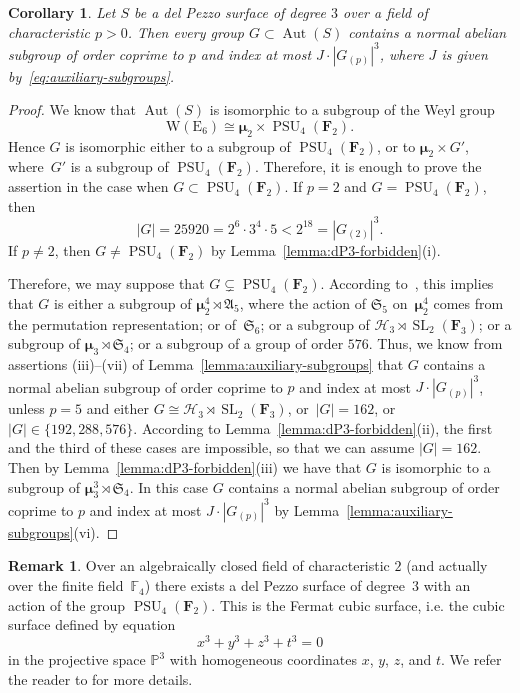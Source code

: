 \documentclass[12pt]{amsart}
\numberwithin{equation}{section}
\newtheorem{corollary}[subsection]{Corollary}
\theoremstyle{definition}
\newtheorem{remark}[subsection]{Remark}
\newcommand{\mumu}{\boldsymbol{\mu}}
\newcommand{\WE}{\mathrm{W}(\mathrm{E}_6)}
\newcommand{\PP}{\mathbb P}
\newcommand{\HHH}{\mathscr{H}}
\DeclareMathOperator{\Aut}{Aut}
\DeclareMathOperator{\SL}{SL}
\DeclareMathOperator{\PSU}{PSU}
\begin{document}
\begin{corollary}\label{corollary:dP3}
Let $S$ be a del Pezzo surface of degree $3$ over a field
of characteristic $p>0$.
Then every group $G\subset\Aut(S)$ contains a normal abelian subgroup of order
coprime to $p$
and index at most $J\cdot |G_{(p)}|^3$, where $J$ is given by~\eqref{eq:auxiliary-subgroups}.
\end{corollary}

\begin{proof}
We know that $\Aut(S)$ is isomorphic to a subgroup of the Weyl group
$$
\WE\cong\mumu_2\times\PSU_4(\mathbf{F}_2).
$$
Hence $G$ is isomorphic either to a subgroup of $\PSU_4(\mathbf{F}_2)$, or
to $\mumu_2\times G'$, where~$G'$ is a subgroup of $\PSU_4(\mathbf{F}_2)$.
Therefore, it is enough to prove the assertion in the case when
$G\subset\PSU_4(\mathbf{F}_2)$.
If $p=2$ and $G=\PSU_4(\mathbf{F}_2)$, then
$$
|G|=25920=2^6\cdot 3^4\cdot 5< 2^{18}=|G_{(2)}|^3.
$$
If $p\neq 2$, then $G\neq \PSU_4(\mathbf{F}_2)$ by Lemma~\ref{lemma:dP3-forbidden}(i).

Therefore, we may suppose that $G\subsetneq\PSU_4(\mathbf{F}_2)$.
According to~\mbox{\cite[p.~26]{Atlas}},
this implies that $G$ is either a subgroup of
$\mumu_2^4\rtimes\mathfrak{A}_5$, where
the action of $\mathfrak{S}_5$ on~$\mumu_2^4$ comes from the permutation representation;
or of~$\mathfrak{S}_6$; or a subgroup of
$\HHH_3\rtimes\SL_2(\mathbf{F}_3)$; or a subgroup of
$\mumu_3\rtimes\mathfrak{S}_4$; or a subgroup of
a group of order $576$.
Thus, we know from assertions (iii)--(vii)
of Lemma~\ref{lemma:auxiliary-subgroups} that $G$ contains a normal abelian subgroup of order
coprime to $p$
and index at most $J\cdot |G_{(p)}|^3$, unless $p=5$ and either
$G\cong \HHH_3\rtimes\SL_2(\mathbf{F}_3)$, or~\mbox{$|G|=162$}, or $|G|\in\{192, 288, 576\}$.
According to Lemma~\ref{lemma:dP3-forbidden}(ii), the first and the third
of these cases are impossible, so that we can assume $|G|=162$.
Then by Lemma~\ref{lemma:dP3-forbidden}(iii)
we have that $G$ is isomorphic to a subgroup of
$ \mumu_3^3\rtimes\mathfrak{S}_4.
$
In this case $G$ contains a normal abelian subgroup of order
coprime to $p$ and index at most $J\cdot |G_{(p)}|^3$
by Lemma~\ref{lemma:auxiliary-subgroups}(vi).
\end{proof}


\begin{remark}
Over an algebraically closed field of characteristic $2$ (and actually over the finite
field~$\mathbb{F}_4$) there exists a del Pezzo surface of degree~$3$
with an action of the group $\PSU_4(\mathbf{F}_2)$. This is the Fermat cubic surface, i.e.
the cubic surface defined by equation
$$
x^3+y^3+z^3+t^3=0
$$
in the projective space $\PP^3$ with homogeneous coordinates $x$, $y$, $z$, and $t$.
We refer the reader to \cite[Lemma~5.1]{DD} for more details.
\end{remark}
\end{document}
